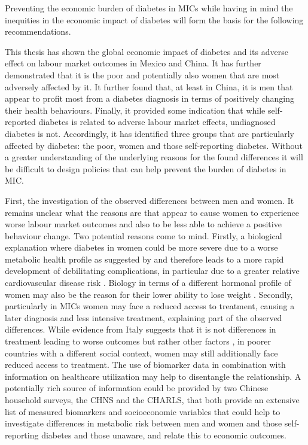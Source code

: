 Preventing the economic burden of diabetes in \acp{MIC} while having in mind the inequities in the economic impact of diabetes will form the basis for the following recommendations.

This thesis has shown the global economic impact of diabetes and its adverse effect on labour market outcomes in Mexico and China. It has further demonstrated that it is the poor and potentially also women that are most adversely affected by it. It further found that, at least in China, it is men that appear to profit most from a diabetes diagnosis in terms of positively changing their health behaviours. Finally, it provided some indication that while self-reported diabetes is related to adverse labour market effects, undiagnosed diabetes is not. Accordingly, it has identified three groups that are particularly affected by diabetes: the poor, women and those self-reporting diabetes. Without a greater understanding of the underlying reasons for the found differences it will be difficult to design policies that can help prevent the burden of diabetes in \ac{MIC}.

First, the investigation of the observed differences between men and women. It remains unclear what the reasons are that appear to cause women to experience worse labour market outcomes and also to be less able to achieve a positive behaviour change. Two potential reasons come to mind. Firstly, a biological explanation where diabetes in women could be more severe due to a worse metabolic health profile as suggested by \textcite{Peters2014,Peters2015} and therefore leads to a more rapid development of debilitating complications, in particular due to a greater relative cardiovascular disease risk \parencite{Arnetz2014,Roche2013,Policardo2014,Catalan2015,Engelmann2016,Seghieri2015}. Biology in terms of a different hormonal profile of women may also be the reason for their lower ability to lose weight \parencite{Penno2013}.  Secondly, particularly in \acp{MIC} women may face a reduced access to treatment, causing a later diagnosis and less intensive treatment, explaining part of the observed differences. While evidence from Italy suggests that it is not differences in treatment leading to worse outcomes but rather other factors \parencite{Penno2013}, in poorer countries with a different social context, women may still additionally face reduced access to treatment. The use of biomarker data in combination with information on healthcare utilization may help to disentangle the relationship. A potentially rich source of information could be provided by two Chinese household surveys, the \acf{CHNS} and the \acf{CHARLS}, that both provide an extensive list of measured biomarkers and socioeconomic variables that could help to investigate differences in metabolic risk between men and women and those self-reporting diabetes and those unaware, and relate this to economic outcomes.

